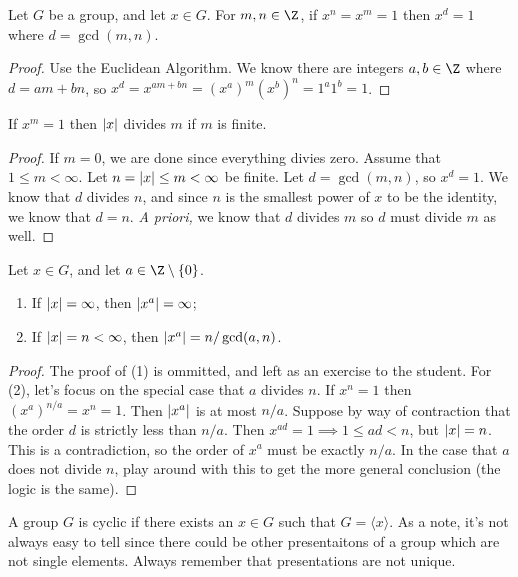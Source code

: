 \begin{proposition}
Let $G$ be a group, and let $x \in G$. For $m,n \in \Z$, if $x^n = x^m = 1$ then $x^d = 1$ where $d = \gcd(m,n)$.
\end{proposition}
\begin{proof}
Use the Euclidean Algorithm. We know there are integers $a,b \in \Z$ where $d = am + bn$, so $x^d = x^{am+bn} = (x^a)^m (x^b)^n = 1^a1^b = 1$.
\end{proof}
\begin{corollary}
If $x^m = 1$ then $\abs{x}$ divides $m$ if $m$ is finite.
\end{corollary}
\begin{proof}
If $m = 0$, we are done since everything divies zero. Assume that $1 \leq m < \infty$. Let $n = \abs{x} \leq m < \infty$ be finite. Let $d = \gcd(m,n)$, so $x^d = 1$. We know that $d$ divides $n$, and since $n$ is the smallest power of $x$ to be the identity, we know that $d = n$. \emph{A priori,} we know that $d$ divides $m$ so $d$ must divide $m$ as well.
\end{proof}
\begin{proposition}
Let $x \in G$, and let $a \in \Z \setminus \{0\}$.
\begin{enumerate}
\item If $\abs{x} = \infty$, then $\abs{x^a} = \infty$;
\item If $\abs{x} = n < \infty$, then $\abs{x^a} = n / \gcd(a,n)$.
\end{enumerate}
\end{proposition}
\begin{proof}
The proof of (1) is ommitted, and left as an exercise to the student. For (2), let's focus on the special case that $a$ divides $n$. If $x^n = 1$ then $(x^a)^{n/a} = x^n = 1$. Then $\abs{x^a}$ is at most $n/a$. Suppose by way of contraction that the order $d$ is strictly less than $n / a$. Then $x^{ad} = 1 \implies 1 \leq ad < n$, but $\abs{x} = n$. This is a contradiction, so the order of $x^a$ must be exactly $n/a$. In the case that $a$ does not divide $n$, play around with this to get the more general conclusion (the logic is the same).
\end{proof}

\begin{definition}
A group $G$ is cyclic if there exists an $x \in G$ such that $G = \langle x \rangle$. As a note, it's not always easy to tell since there could be other presentaitons of a group which are not single elements. Always remember that presentations are not unique.
\end{definition}

